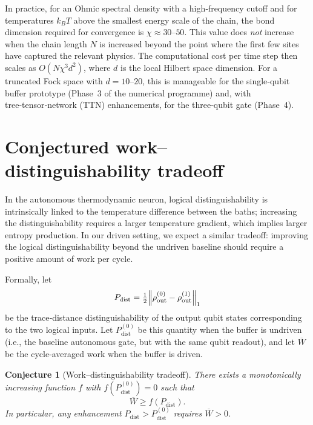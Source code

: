 \documentclass[11pt,a4paper]{article}
\newtheorem{conjecture}{Conjecture}[section]
\theoremstyle{definition}
\theoremstyle{remark}
\begin{document}
In practice, for an Ohmic spectral density with a high‑frequency cutoff and for temperatures $k_B T$ above the smallest energy scale of the chain, the bond dimension required for convergence is $\chi \approx 30$–$50$. This value does \emph{not} increase when the chain length $N$ is increased beyond the point where the first few sites have captured the relevant physics. The computational cost per time step then scales as $O(N\chi^3 d^2)$, where $d$ is the local Hilbert space dimension. For a truncated Fock space with $d=10$–$20$, this is manageable for the single‑qubit buffer prototype (Phase~3 of the numerical programme) and, with tree‑tensor‑network (TTN) enhancements, for the three‑qubit gate (Phase~4).

\section{Conjectured work–distinguishability tradeoff}\label{sec:conjecture}
In the autonomous thermodynamic neuron, logical distinguishability is intrinsically linked to the temperature difference between the baths; increasing the distinguishability requires a larger temperature gradient, which implies larger entropy production. In our driven setting, we expect a similar tradeoff: improving the logical distinguishability beyond the undriven baseline should require a positive amount of work per cycle.

Formally, let
\begin{equation}
P_{\text{dist}} = \tfrac12 \norm{ \rho_{\text{out}}^{(0)} - \rho_{\text{out}}^{(1)} }_1
\end{equation}
be the trace‑distance distinguishability of the output qubit states corresponding to the two logical inputs. Let $P_{\text{dist}}^{(0)}$ be this quantity when the buffer is undriven (i.e., the baseline autonomous gate, but with the same qubit readout), and let $\overline{W}$ be the cycle‑averaged work when the buffer is driven.

\begin{conjecture}[Work–distinguishability tradeoff]\label{conj:tradeoff}
There exists a monotonically increasing function $f$ with $f(P_{\text{dist}}^{(0)})=0$ such that
\begin{equation}
\overline{W} \ge f(P_{\text{dist}}).
\end{equation}
In particular, any enhancement $P_{\text{dist}} > P_{\text{dist}}^{(0)}$ requires $\overline{W}>0$.
\end{conjecture}
\end{document}
